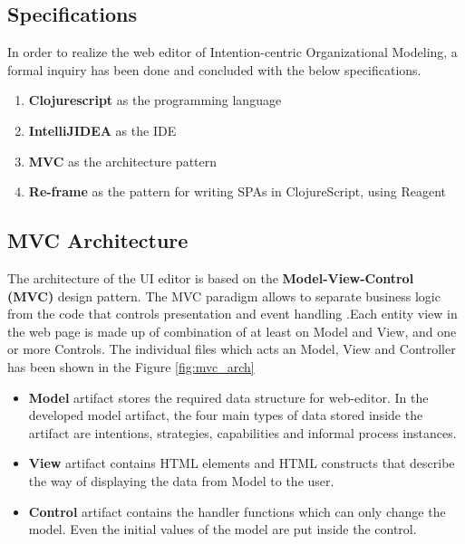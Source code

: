 \subsection{Specifications}
\label{subsec:specifications}
In order to realize the web editor of Intention-centric Organizational Modeling, a formal inquiry has been done and concluded with the below specifications.

\begin{enumerate}   
	\item \textbf{Clojurescript} as the programming language
	\item \textbf{IntelliJIDEA} as the IDE
	\item \textbf{MVC} as the architecture pattern
	\item \textbf{Re-frame} as the pattern for writing SPAs in ClojureScript, using Reagent	
\end{enumerate}

\subsection{MVC Architecture}
\label{subsec:mvcarch}
 The architecture of the UI editor is based on the \textbf{Model-View-Control (MVC)} design pattern. The MVC paradigm allows to separate business logic from the code that controls presentation and event handling \cite{Oracle2016}.Each entity view in the web page is made up of combination of at least on Model and View, and one or more Controls. The individual files which acts an Model, View and Controller has been shown in the Figure \ref{fig:mvc_arch}

\begin{itemize}
	\item \textbf{Model} artifact stores the required data structure for web-editor. In the developed model artifact, the four main types of data stored inside the artifact are intentions, strategies, capabilities and informal process instances. 
	\item \textbf{View} artifact contains HTML elements and HTML constructs that describe the way of displaying the data from Model to the user.
	\item \textbf{Control} artifact contains the handler functions which can only change the model. Even the initial values of the model are put inside the control. 
\end{itemize}


